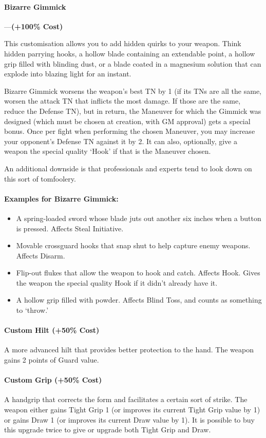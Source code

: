 \documentclass[oneside,11pt,english]{book}
\begin{document}
\paragraph{\label{par:Bizarre Gimmick}Bizarre Gimmick}---\quad \textbf{(+100\% Cost)}\par
This customisation allows you to add hidden quirks to your weapon. Think hidden parrying hooks, a hollow blade containing an extendable point, a hollow grip filled with blinding dust, or a blade coated in a magnesium solution that can explode into blazing light for an instant.

Bizarre Gimmick worsens the weapon’s best TN by 1 (if its TNs are all the same, worsen the attack TN that inflicts the most damage. If those are the same, reduce the Defense TN), but in return, the Maneuver for which the Gimmick was designed (which must be chosen at creation, with GM approval) gets a special bonus. Once per fight when performing the chosen Maneuver, you may increase your opponent’s Defense TN against it by 2. It can also, optionally, give a weapon the special quality ‘Hook’ if that is the Maneuver chosen.

An additional downside is that professionals and experts tend to look down on this sort of tomfoolery.
\paragraph{Examples for Bizarre Gimmick:}
\begin{itemize}
	\item A spring-loaded sword whose blade juts out another six inches when a button is pressed. Affects Steal Initiative.
	\item Movable crossguard hooks that snap shut to help capture enemy weapons. Affects Disarm.
	\item Flip-out flukes that allow the weapon to hook and catch. Affects Hook. Gives the weapon the special quality Hook if it didn’t already have it.
	\item A hollow grip filled with powder. Affects Blind Toss, and counts as something to ‘throw.’
\end{itemize}
\paragraph{Custom Hilt (+50\% Cost)}\par
A more advanced hilt that provides better protection to the hand. The weapon gains 2 points of Guard value.
\paragraph{Custom Grip (+50\% Cost)}\par
A handgrip that corrects the form and facilitates a certain sort of strike. The weapon either gains Tight Grip 1 (or improves its current Tight Grip value by 1) or gains Draw 1 (or improves its current Draw value by 1). It is possible to buy this upgrade twice to give or upgrade both Tight Grip and Draw.
\end{document}
